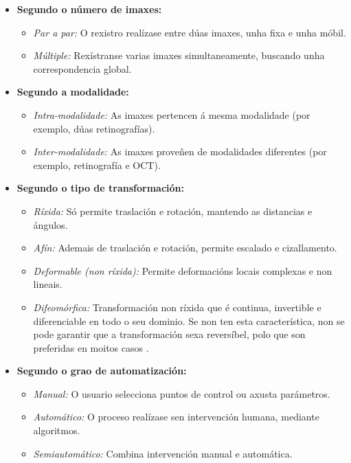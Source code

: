 \begin{itemize}
    \item \textbf{Segundo o número de imaxes:}
    \begin{itemize}
        \item \textit{Par a par:} O rexistro realízase entre dúas imaxes, unha fixa e unha móbil.
        \item \textit{Múltiple:} Rexístranse varias imaxes simultaneamente, buscando unha correspondencia global.
    \end{itemize}

    \item \textbf{Segundo a modalidade:}
    \begin{itemize}
        \item \textit{Intra-modalidade:} As imaxes pertencen á mesma modalidade (por exemplo, dúas retinografías).
        \item \textit{Inter-modalidade:} As imaxes proveñen de modalidades diferentes (por exemplo, retinografía e OCT).
    \end{itemize}

    \item \textbf{Segundo o tipo de transformación:}
    \begin{itemize}
        \item \textit{Ríxida:} Só permite traslación e rotación, mantendo as distancias e ángulos.
        \item \textit{Afín:} Ademais de traslación e rotación, permite escalado e cizallamento.
        \item \textit{Deformable (non ríxida):} Permite deformacións locais complexas e non lineais.
        \item \textit{Difeomórfica:} Transformación non ríxida que é continua, invertible e diferenciable en todo o seu dominio. Se non ten esta característica, non se pode garantir que a transformación sexa reversíbel, polo que son preferidas en moitos casos \cite{han2022diffeomorphicimageregistrationneural}.
    \end{itemize}

    \item \textbf{Segundo o grao de automatización:} \cite{deeplernreview3dreg}
    \begin{itemize}
        \item \textit{Manual:} O usuario selecciona puntos de control ou axusta parámetros.
        \item \textit{Automático:} O proceso realízase sen intervención humana, mediante algoritmos.
        \item \textit{Semiautomático:} Combina intervención manual e automática.
    \end{itemize}


\end{itemize}
